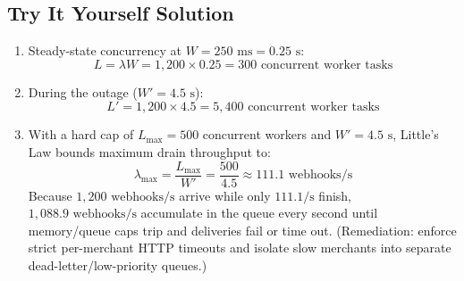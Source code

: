\subsection*{Try It Yourself Solution}
\begin{enumerate}[leftmargin=18pt]
  \item Steady-state concurrency at $W = 250\text{ ms} = 0.25\text{ s}$:
  $$L = \lambda W = 1,200 \times 0.25 = 300\text{ concurrent worker tasks}$$
  \item During the outage ($W' = 4.5\text{ s}$):
  $$L' = 1,200 \times 4.5 = 5,400\text{ concurrent worker tasks}$$
  \item With a hard cap of $L_{\max} = 500$ concurrent workers and $W' = 4.5\text{ s}$, Little's Law bounds maximum drain throughput to:
  $$\lambda_{\max} = \frac{L_{\max}}{W'} = \frac{500}{4.5} \approx 111.1\text{ webhooks/s}$$
  Because $1,200\text{ webhooks/s}$ arrive while only $111.1\text{/s}$ finish, $1,088.9\text{ webhooks/s}$ accumulate in the queue every second until memory/queue caps trip and deliveries fail or time out. (Remediation: enforce strict per-merchant HTTP timeouts and isolate slow merchants into separate dead-letter/low-priority queues.)
\end{enumerate}

